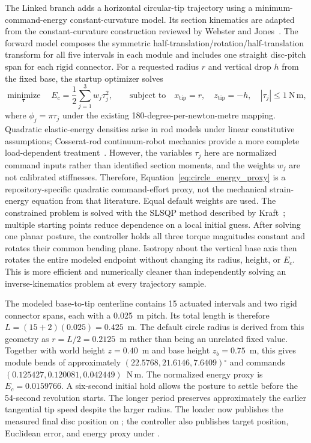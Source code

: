 \documentclass[11pt,letterpaper]{article}
\newcommand{\degrees}{\ensuremath{^{\circ}}}
\begin{document}
The Linked branch adds a horizontal circular-tip trajectory using a
minimum-command-energy constant-curvature model. Its section kinematics are
adapted from the constant-curvature construction reviewed by Webster and
Jones~\cite{webster2010}. The forward model composes
the symmetric half-translation/rotation/half-translation transform for all
five intervals in each module and includes one straight disc-pitch span for
each rigid connector. For a requested radius $r$ and vertical drop $h$ from
the fixed base, the startup optimizer solves
\begin{equation}
 \underset{\boldsymbol{\tau}}{\operatorname{minimize}}\quad
 E_c=\frac{1}{2}\sum_{j=1}^{3}w_j\tau_j^2,
 \qquad
 \text{subject to}\quad x_{\mathrm{tip}}=r,\quad
 z_{\mathrm{tip}}=-h,\quad |\tau_j|\leq1~\mathrm{N\,m},
 \label{eq:circle_energy_proxy}
\end{equation}
where $\phi_j=\pi\tau_j$ under the existing 180-degree-per-newton-metre
mapping. Quadratic elastic-energy densities arise in rod models under linear
constitutive assumptions; Cosserat-rod continuum-robot mechanics provide a
more complete load-dependent treatment~\cite{rucker2011}. However, the
variables $\tau_j$ here are normalized command inputs rather than identified
section moments, and the weights $w_j$ are not calibrated stiffnesses.
Therefore, Equation~\eqref{eq:circle_energy_proxy} is a repository-specific
quadratic command-effort proxy, not the mechanical strain-energy equation from
that literature. Equal default weights are used. The constrained problem is
solved with the SLSQP method described by Kraft~\cite{kraft1988}; multiple
starting points reduce dependence on a local initial guess. After solving one
planar posture, the controller holds all three torque magnitudes constant and
rotates their common bending plane. Isotropy about the vertical base axis then
rotates the entire modeled endpoint without changing its radius, height, or
$E_c$. This is more efficient and numerically cleaner than independently
solving an inverse-kinematics problem at every trajectory sample.

The modeled base-to-tip centerline contains 15 actuated intervals and two
rigid connector spans, each with a 0.025~m pitch. Its total length is therefore
$L=(15+2)(0.025)=0.425$~m. The default circle radius is derived from this
geometry as $r=L/2=0.2125$~m rather than being an unrelated fixed value.
Together with world height $z=0.40$~m and base height $z_b=0.75$~m, this gives
module bends of approximately $(22.5768,21.6146,7.6409)\degrees{}$ and commands
$(0.125427,0.120081,0.042449)$~N\,m. The normalized energy proxy is
$E_c=0.0159766$. A six-second initial hold allows the posture to settle before
the 54-second revolution starts. The longer period preserves approximately the
earlier tangential tip speed despite the larger radius. The loader now publishes the measured final
disc position on ; the controller also
publishes target position, Euclidean error, and energy proxy under
.
\end{document}
